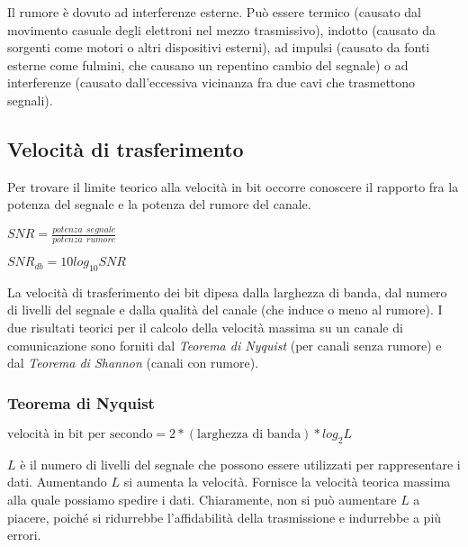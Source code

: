         Il rumore è dovuto ad interferenze esterne. Può essere termico (causato dal movimento casuale degli elettroni nel mezzo trasmissivo), indotto (causato da sorgenti come motori o altri dispositivi esterni), ad impulsi (causato da fonti esterne come fulmini, che causano un repentino cambio del segnale) o ad interferenze (causato dall'eccessiva vicinanza fra due cavi che trasmettono segnali).
    
    \subsection{Velocità di trasferimento}
    
        Per trovare il limite teorico alla velocità in bit occorre conoscere il rapporto fra la potenza del segnale e la potenza del rumore del canale.
    
        \begin{center}
            \(SNR = \frac{potenza\ \ segnale}{potenza\ \ rumore}\)
            
            \vspace{3mm}
            
            \(SNR_{db} = 10 log_{10} SNR\)
        \end{center}
        
        La velocità di trasferimento dei bit dipesa dalla larghezza di banda, dal numero di livelli del segnale e dalla qualità del canale (che induce o meno al rumore). I due risultati teorici per il calcolo della velocità massima su un canale di comunicazione sono forniti dal \textit{Teorema di Nyquist} (per canali senza rumore) e dal \textit{Teorema di Shannon} (canali con rumore).
        
        \subsubsection{Teorema di Nyquist}
        
            \(\text{velocità in bit per secondo}=2*(\text{larghezza di banda})*log_2 L\)
            
            \vspace{3mm}
            
            \(L\) è il numero di livelli del segnale che possono essere utilizzati per rappresentare i dati. Aumentando \(L\) si aumenta la velocità. Fornisce la velocità teorica massima alla quale possiamo spedire i dati. Chiaramente, non si può aumentare \(L\) a piacere, poiché si ridurrebbe l'affidabilità della trasmissione e indurrebbe a più errori.
        
